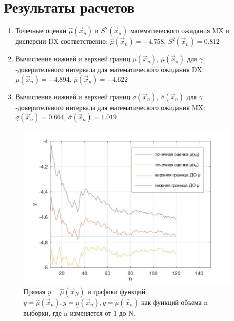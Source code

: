 \chapter{Результаты расчетов}
\begin{enumerate}
	\item Точечные оценки $\hat \mu (\vec x_n)$ и $ S^2 (\vec x_n)$ математического ожидания MX и дисперсии DX соответственно: $\hat \mu (\vec x_n) = -4.758$, $ S^2 (\vec x_n) = 0.812$
	\item Вычисление нижней и верхней границ $\underline \mu (\vec x_n)$, 
	$\overline \mu (\vec x_n)$ для $\gamma$-доверительного интервала для математического ожидания DX: 
	$\underline \mu (\vec x_n) = -4.894$, $\overline\mu (\vec x_n) = -4.622$

	\item Вычисление нижней и верхней границ $\underline \sigma (\vec x_n)$, 
	$\overline \sigma (\vec x_n)$ для $\gamma$-доверительного интервала для математического ожидания MX: 
	$\underline \sigma (\vec x_n) = 0.664$, $\overline \sigma (\vec x_n) = 1.019$
\end{enumerate}

\begin{figure}[ht!]
		\centering
		\includegraphics[scale=0.4]{assets/g-1.jpg}
		\caption{Прямая $y=\hat \mu (\vec x_N)$ и графики функций $y=\hat \mu (\vec x_n), y= \underline \mu (\vec x_n), y =\overline \mu (\vec x_n)$ как функций объема n выборки, где n изменяется от 1 до N.}
\end{figure}

